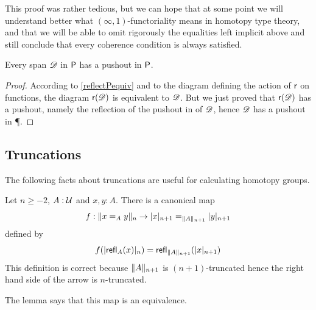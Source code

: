 This proof was rather tedious, but we can hope that at some point we will
understand better what $(\infty,1)$-functoriality means in homotopy type theory, and
that we will be able to omit rigorously the equalities left implicit above and still
conclude that every coherence condition is always satisfied.

\begin{cor}
  Every span $\Ddiag$ in $\P$ has a pushout in $\P$.
\end{cor}

\begin{proof}
  According to \autoref{reflectPequiv} and to the diagram defining the action of
  $\reflect$ on functions, the diagram $\reflect(\Ddiag)$ is equivalent to
  $\Ddiag$. But we just proved that $\reflect(\Ddiag)$ has a pushout, namely the
  reflection of the pushout in \type of $\Ddiag$, hence $\Ddiag$ has a pushout
  in \P.
\end{proof}

\subsection{Truncations}

The following facts about truncations are useful for calculating
homotopy groups.  

\begin{lem}
  Let $n\ge-2$, $A:\type$ and $x,y:A$. There is a canonical map
  \[f:\trunc n{x=_Ay}\to\tproj {n+1}x=_{\trunc{n+1}A}\tproj {n+1}y\]
  defined by
  \[f(\tproj n{\refl{A}(x)})=\refl{\trunc {n+1}A}(\tproj {n+1}x)\]
  This definition is correct because $\trunc {n+1}A$ is $(n+1)$-truncated hence
  the right hand side of the arrow is $n$-truncated.

  The lemma says that this map is an equivalence.
\end{lem}

